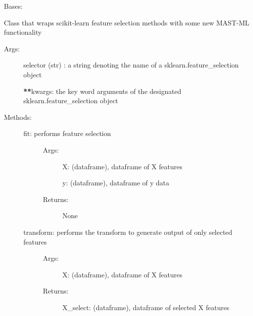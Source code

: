 \documentclass[letterpaper,10pt,english]{sphinxmanual}
\begin{document}
\begin{fulllineitems}
\label{\detokenize{api/mastml.feature_selectors.SklearnFeatureSelector:mastml.feature_selectors.SklearnFeatureSelector}}
Bases: {\hyperref[\detokenize{api/mastml.feature_selectors.BaseSelector:mastml.feature_selectors.BaseSelector}]{}}

Class that wraps scikit-learn feature selection methods with some new MAST-ML functionality
\begin{description}
\item[{Args:}] \leavevmode
selector (str) : a string denoting the name of a sklearn.feature\_selection object

{\color{red}\bfseries{}**}kwargs: the key word arguments of the designated sklearn.feature\_selection object

\item[{Methods:}] \leavevmode\begin{description}
\item[{fit: performs feature selection}] \leavevmode\begin{description}
\item[{Args:}] \leavevmode
X: (dataframe), dataframe of X features

y: (dataframe), dataframe of y data

\item[{Returns:}] \leavevmode
None

\end{description}

\item[{transform: performs the transform to generate output of only selected features}] \leavevmode\begin{description}
\item[{Args:}] \leavevmode
X: (dataframe), dataframe of X features

\item[{Returns:}] \leavevmode
X\_select: (dataframe), dataframe of selected X features

\end{description}

\end{description}

\end{description}

\end{fulllineitems}
\end{document}
